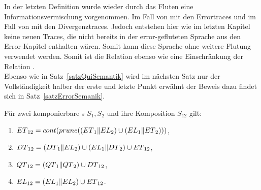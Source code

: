 In der letzten Definition wurde wieder durch das Fluten eine
Informationsvermischung vorgenommen. Im Fall von \DT{} mit den Errortraces und
im Fall von \QT{} mit den Divergenztraces. Jedoch entstehen hier wie im letzten
Kapitel keine neuen Traces, die nicht bereits in der error-gefluteten Sprache
\EL{} aus den Error-Kapitel enthalten wären. Somit kann diese Sprache ohne
weitere Flutung verwendet werden. Somit ist die Relation \DRel{} ebenso wie
\QRel{} eine Einschränkung der Relation \ERel{}.\\
Ebenso wie in Satz~\ref{satzQuiSemantik} wird im nächsten Satz nur der
Vollständigkeit halber der erste und letzte Punkt erwähnt der Beweis dazu
findet sich in Satz~\ref{satzErrorSemanik}.

\begin{satz}
  Für zwei komponierbare \EIO{}s $S_1, S_2$ und ihre Komposition
  $S_{12}$ gilt:
  \begin{enumerate}
    \item $ET{}_{12}=cont (prune ((ET{}_1\|EL{}_2)\cup
      (EL{}_1\|ET{}_2)))$,
    \item $DT{}_{12}= (DT{}_1\|EL{}_2)\cup (EL{}_1\|DT{}_2)\cup
      ET{}_{12}$,
    \item $QT{}_{12}=(QT{}_1\|QT{}_2)\cup DT{}_{12}$,
    \item $EL{}_{12}=(EL{}_1\|EL{}_2)\cup ET{}_{12}$.
  \end{enumerate}
\end{satz}


